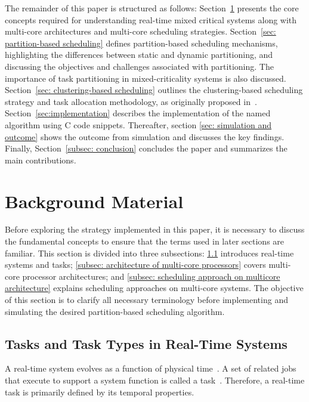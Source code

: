 \documentclass[conference]{IEEEtran}
\begin{document}
The remainder of this paper is structured as follows: 
Section~\ref{sec:fundamentals} presents the core concepts required for understanding real-time mixed critical systems along with multi-core architectures and multi-core scheduling strategies.
Section~\ref{sec: partition-based scheduling} defines partition-based scheduling mechanisms, highlighting the differences between static and dynamic partitioning, and discussing the objectives and challenges associated with partitioning. The importance of task partitioning in mixed-criticality systems is also discussed. 
Section~\ref{sec: clustering-based scheduling} outlines the clustering-based scheduling strategy and task allocation methodology, as originally proposed in~\cite{AbdallahGB24}.
Section~\ref{sec:implementation} describes the implementation of the named algorithm using C code snippets. Thereafter, section \ref{sec: simulation and outcome} shows the outcome from simulation and discusses the key findings. 
Finally, Section~\ref{subsec: conclusion} concludes the paper and summarizes the main contributions.




\section{Background Material}
\label{sec:fundamentals}
Before exploring the strategy implemented in this paper, it is necessary to discuss the fundamental concepts to ensure that the terms used in later sections are familiar. This section is divided into three subsections: \ref{subsec:task and task types} introduces real-time systems and tasks; \ref{subsec: architecture of multi-core processors} covers multi-core processor architectures; and \ref{subsec: scheduling approach on multicore architecture} explains scheduling approaches on multi-core systems. The objective of this section is to clarify all necessary terminology before implementing and simulating the desired partition-based scheduling algorithm.

\subsection{Tasks and Task Types in Real-Time Systems}
\label{subsec:task and task types}
A real-time system evolves as a function of physical time~\cite{kopetzDist}. A set of related jobs that execute to support a system function is called a task~\cite{9999}. Therefore, a real-time task is primarily defined by its temporal properties.
\end{document}
